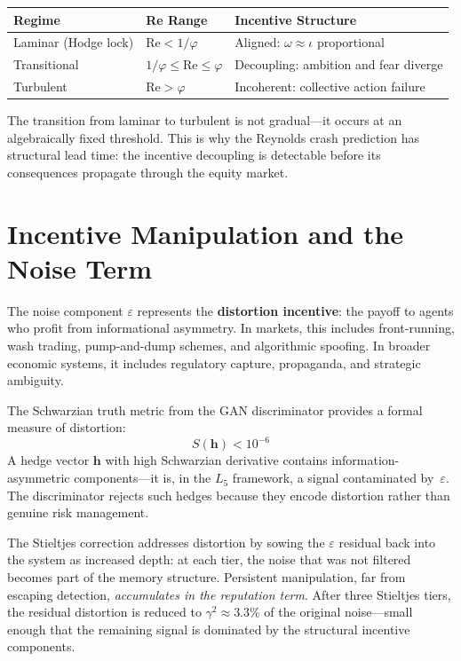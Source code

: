 \begin{center}
\begin{tabular}{@{}lll@{}}
\toprule
\textbf{Regime} & \textbf{Re Range} & \textbf{Incentive Structure} \\
\midrule
Laminar (Hodge lock) & $\mathrm{Re} < 1/\varphi$ & Aligned: $\omega \approx \iota$ proportional \\
Transitional & $1/\varphi \leq \mathrm{Re} \leq \varphi$ & Decoupling: ambition and fear diverge \\
Turbulent & $\mathrm{Re} > \varphi$ & Incoherent: collective action failure \\
\bottomrule
\end{tabular}
\end{center}

The transition from laminar to turbulent is not gradual---it occurs at an algebraically fixed threshold. This is why the Reynolds crash prediction has structural lead time: the incentive decoupling is detectable before its consequences propagate through the equity market.

\section{Incentive Manipulation and the Noise Term}

The noise component $\varepsilon$ represents the \textbf{distortion incentive}: the payoff to agents who profit from informational asymmetry. In markets, this includes front-running, wash trading, pump-and-dump schemes, and algorithmic spoofing. In broader economic systems, it includes regulatory capture, propaganda, and strategic ambiguity.

The Schwarzian truth metric from the GAN discriminator provides a formal measure of distortion:
\begin{equation}
    S(\mathbf{h}) < 10^{-6}
\end{equation}
A hedge vector $\mathbf{h}$ with high Schwarzian derivative contains information-asymmetric components---it is, in the $L_5$ framework, a signal contaminated by~$\varepsilon$. The discriminator rejects such hedges because they encode distortion rather than genuine risk management.

The Stieltjes correction addresses distortion by sowing the $\varepsilon$ residual back into the system as increased depth: at each tier, the noise that was not filtered becomes part of the memory structure. Persistent manipulation, far from escaping detection, \emph{accumulates in the reputation term}. After three Stieltjes tiers, the residual distortion is reduced to $\gamma^2 \approx 3.3\%$ of the original noise---small enough that the remaining signal is dominated by the structural incentive components.


